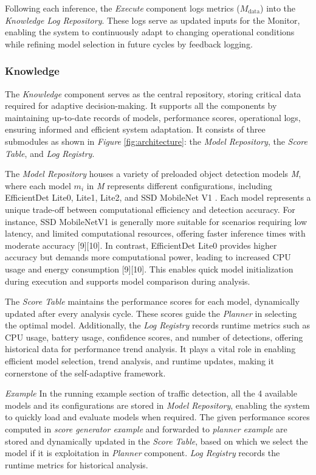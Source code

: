 Following each inference, the \textit{Execute} component logs metrics (\(M_\text{data}\)) into the \textit{Knowledge Log Repository}. These logs serve as updated inputs for the Monitor, enabling the system to continuously adapt to changing operational conditions while refining model selection in future cycles by feedback logging. 

\subsubsection{\textbf{Knowledge}}

The \textit{Knowledge} component serves as the central repository, storing critical data required for adaptive decision-making. It supports all the components by maintaining up-to-date records of models, performance scores, operational logs, ensuring informed and efficient system adaptation. It consists of three submodules as shown in \textit{Figure} \ref{fig:architecture}: the \textit{Model Repository}, the \textit{Score Table}, and \textit{Log Registry}. 

The \textit{Model Repository}  houses a variety of preloaded object detection models \textit{M}, where each model \(m_i\)  in \textit{M} represents different configurations, including EfficientDet Lite0, Lite1, Lite2, and SSD MobileNet V1 \cite{b36}\cite{b37}. Each model represents a unique trade-off between computational efficiency and detection accuracy. For instance, SSD MobileNetV1 is generally more suitable for scenarios requiring low latency, and limited computational resources, offering faster inference times with moderate accuracy [9][10]. In contrast, EfficientDet Lite0 provides higher accuracy but demands more computational power, leading to increased CPU usage and energy consumption [9][10].  This enables quick model initialization during execution and supports model comparison during analysis. 

The \textit{Score Table} maintains the performance scores for each model, dynamically updated after every analysis cycle. These scores guide the \textit{Planner} in selecting the optimal model. Additionally, the \textit{Log Registry} records runtime metrics such as CPU usage, battery usage, confidence scores, and number of detections, offering historical data for performance trend analysis. It plays a vital role in enabling efficient model selection, trend analysis, and runtime  updates, making it cornerstone of the self-adaptive framework. 

\textit{Example} In the running example section of traffic detection, all the 4 available models and its configurations are stored in \textit{Model Repository}, enabling the system to quickly load and evaluate models when required. The given performance scores computed in \textit{score generator example} and forwarded to \textit{planner example} are stored and dynamically updated in the \textit{Score Table}, based on which we select the model if it is exploitation in \textit{Planner} component. \textit{Log Registry} records the runtime metrics for historical analysis.

